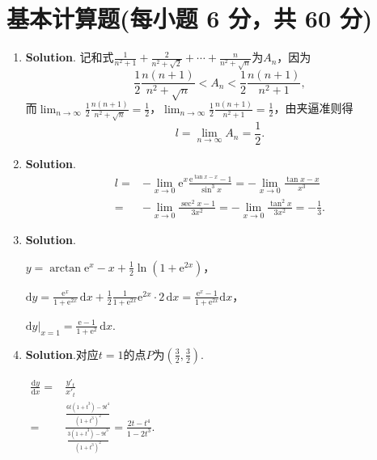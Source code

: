 \documentclass[../Main.tex]{subfiles}
\begin{document}
\section{基本计算题(每小题 6 分，共 60 分)}
\begin{enumerate}
    \item \textbf{Solution}. 记和式$\frac{1}{n^{2}+1}+\frac{2}{n^{2}+\sqrt{2}}+\cdots
              +\frac{n}{n^{2}+\sqrt{n}}$为$A_{n}$，因为
          \[
              \frac{1}{2}\frac{n(n+1)}{n^{2}+\sqrt{n}}<A_{n}<\frac{1}{2}\frac{n(n+1)}{n^{2}+1}
              ,
          \]
          而$\lim_{n\to\infty}\frac{1}{2}\frac{n(n+1)}{n^{2}+\sqrt{n}}=\frac{1}{2}$，$\lim
              _{n\to\infty}\frac{1}{2}\frac{n(n+1)}{n^{2}+1}=\frac{1}{2}$，由夹逼准则得
          \[
              l=\lim_{n\to\infty}A_{n}=\frac{1}{2}.
          \]

    \item \textbf{Solution}.
          \[
              \begin{aligned}
                  l= & -\lim_{x\to 0}\mathrm{e}^{x}\frac{\mathrm{e}^{\tan x-x}-1}{\sin^3 x}=-\lim_{x\to0}\frac{\tan x-x}{x^3} \\
                  =  & -\lim_{x\to0}\frac{\sec ^2 x-1}{3x^2}=-\lim_{x\to0}\frac{\tan^2 x}{3x^2}=-\frac{1}{3}.
              \end{aligned}
          \]

    \item \textbf{Solution}.

          $y=\arctan \mathrm{e}^{x} -x+\frac{1}{2}\ln(1+\mathrm{e}^{2x})$，

          $\mathrm{d}y=\frac{\mathrm{e}^{x}}{1+\mathrm{e}^{2x}}\,\mathrm{d}x+\frac{1}{2}
              \frac{1}{1+\mathrm{e}^{2x}}\mathrm{e}^{2x}\cdot2\,\mathrm{d}x=\frac{\mathrm{e}^{x}-1}{1+\mathrm{e}^{2x}}
              \mathrm{d}x$，

          $\mathrm{d}y\big |_{x=1}=\frac{\mathrm{e}-1}{1+\mathrm{e}^{2}}\,\mathrm{d}x$.

    \item \textbf{Solution}.对应$t=1$的点$P$为$\left(\frac{3}{2},\frac{3}{2}\right
              )$.

          $\begin{aligned}
                  \frac{\mathrm{d}y}{\mathrm{d}x}= & \frac{y'_{t}}{x'_{t}}                                                                                               \\
                  =                                & \frac{\frac{6t(1+t^{3})-9t^{4}}{(1+t^{3})^{2}}}{\frac{3(1+t^{3})-9t^{3}}{(1+t^{3})^{2}}}=\frac{2t-t^{4}}{1-2t^{3}}.
              \end{aligned}$


\end{enumerate}
\end{document}
